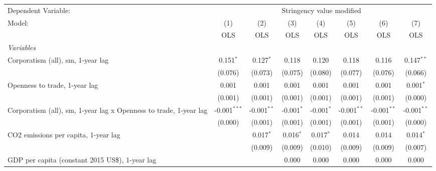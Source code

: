 
\begingroup
\centering
\begin{tabular}{lccccccc}
   \toprule
   Dependent Variable: & \multicolumn{7}{c}{Stringency value modified}\\
   Model:                                                            & (1)            & (2)           & (3)          & (4)          & (5)           & (6)           & (7)\\  
                                                                     &  OLS           & OLS           & OLS          & OLS          & OLS           & OLS           & OLS\\  
   \midrule
   \emph{Variables}\\
   Corporatism (all), sm, 1-year lag                                 & 0.151$^{*}$    & 0.127$^{*}$   & 0.118        & 0.120        & 0.118         & 0.116         & 0.147$^{**}$\\   
                                                                     & (0.076)        & (0.073)       & (0.075)      & (0.080)      & (0.077)       & (0.076)       & (0.066)\\   
   Openness to trade, 1-year lag                                     & 0.001          & 0.001         & 0.001        & 0.001        & 0.001         & 0.001         & 0.001$^{*}$\\   
                                                                     & (0.001)        & (0.001)       & (0.001)      & (0.001)      & (0.001)       & (0.001)       & (0.000)\\   
   Corporatism (all), sm, 1-year lag x Openness to trade, 1-year lag & -0.001$^{***}$ & -0.001$^{**}$ & -0.001$^{*}$ & -0.001$^{*}$ & -0.001$^{**}$ & -0.001$^{**}$ & -0.001$^{**}$\\   
                                                                     & (0.000)        & (0.001)       & (0.001)      & (0.001)      & (0.001)       & (0.001)       & (0.000)\\   
   CO2 emissions per capita, 1-year lag                              &                & 0.017$^{*}$   & 0.016$^{*}$  & 0.017$^{*}$  & 0.014         & 0.014         & 0.014$^{*}$\\   
                                                                     &                & (0.009)       & (0.009)      & (0.010)      & (0.009)       & (0.009)       & (0.007)\\   
   GDP per capita (constant 2015 US\$), 1-year lag                   &                &               & 0.000        & 0.000        & 0.000         & 0.000         & 0.000\\   

\end{tabular}
